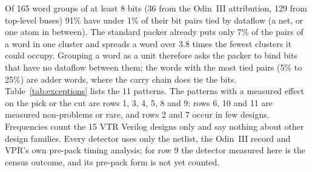  Of 165 word groups of at least 8 bits (36 from the Odin~III attribution, 129 from top-level buses) 91\% have under 1\% of their bit pairs tied by dataflow (a net, or one atom in between). The standard packer already puts only 7\% of the pairs of a word in one cluster and spreads a word over 3.8 times the fewest clusters it could occupy. Grouping a word as a unit therefore asks the packer to bind bits that have no dataflow between them; the words with the most tied pairs (5\% to 25\%) are adder words, where the carry chain does tie the bits.
 Table~\ref{tab:exceptions} lists the 11 patterns. The patterns with a measured effect on the pick or the cut are rows 1, 3, 4, 5, 8 and 9; rows 6, 10 and 11 are measured non-problems or rare, and rows 2 and 7 occur in few designs. Frequencies count the 15 VTR Verilog designs only and say nothing about other design families. Every detector uses only the netlist, the Odin~III record and VPR's own pre-pack timing analysis; for row 9 the detector measured here is the census outcome, and its pre-pack form is not yet counted.

